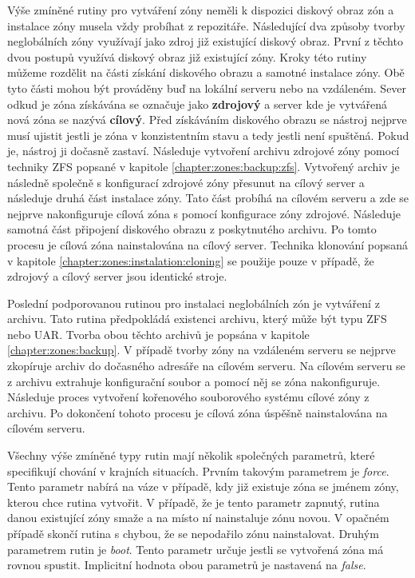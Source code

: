 Výše zmíněné rutiny pro vytváření zóny neměli k dispozici diskový obraz zón a instalace zóny musela vždy probíhat z repozitáře.
Následující dva způsoby tvorby neglobálních zóny využívají jako zdroj již existující diskový obraz. První z těchto dvou postupů
využívá diskový obraz již existující zóny. Kroky této rutiny můžeme rozdělit na části získání diskového obrazu a samotné instalace
zóny. Obě tyto části mohou být prováděny buď na lokální serveru nebo na vzdáleném. Sever odkud je zóna získávána se označuje
jako \textbf{zdrojový} a server kde je vytvářená nová zóna se nazývá \textbf{cílový}. Před získáváním diskového obrazu se 
nástroj nejprve musí ujistit jestli je zóna v konzistentním stavu a tedy jestli není spuštěná. Pokud je, nástroj ji dočasně zastaví.
Následuje vytvoření archivu zdrojové zóny pomocí techniky ZFS popsané v kapitole \ref{chapter:zones:backup:zfs}. Vytvořený archiv je
následně společně s konfigurací zdrojové zóny přesunut na cílový server a následuje druhá část instalace zóny. Tato část probíhá na
cílovém serveru a zde se nejprve nakonfiguruje cílová zóna s pomocí konfigurace zóny zdrojové. Následuje samotná část připojení
diskového obrazu z poskytnutého archivu. Po tomto procesu je cílová zóna nainstalována na cílový server. Technika klonování
popsaná v kapitole \ref{chapter:zones:instalation:cloning} se použije pouze v případě, že zdrojový a cílový server jsou 
identické stroje.

Poslední podporovanou rutinou pro instalaci neglobálních zón je vytváření z archivu. Tato rutina předpokládá existenci archivu,
který může být typu ZFS nebo UAR. Tvorba obou těchto archivů je popsána v kapitole \ref{chapter:zones:backup}. V případě tvorby
zóny na vzdáleném serveru se nejprve zkopíruje archiv do dočasného adresáře na cílovém serveru. Na cílovém serveru se z archivu
extrahuje konfigurační soubor a pomocí něj se zóna nakonfiguruje. Následuje proces vytvoření kořenového souborového systému cílové
zóny z archivu. Po dokončení tohoto procesu je cílová zóna úspěšně nainstalována na cílovém serveru.

Všechny výše zmíněné typy rutin mají několik společných parametrů, které specifikují chování v krajních situacích. Prvním
takovým parametrem je \textit{force}. Tento parametr nabírá na váze v případě, kdy již existuje zóna se jménem zóny, kterou
chce rutina vytvořit. V případě, že je tento parametr zapnutý, rutina danou existující zóny smaže a na místo ní nainstaluje
zónu novou. V opačném případě skončí rutina s chybou, že se nepodařilo zónu nainstalovat. Druhým parametrem rutin je \textit{boot}.
Tento parametr určuje jestli se vytvořená zóna má rovnou spustit. Implicitní hodnota obou parametrů je nastavená na \textit{false}.
